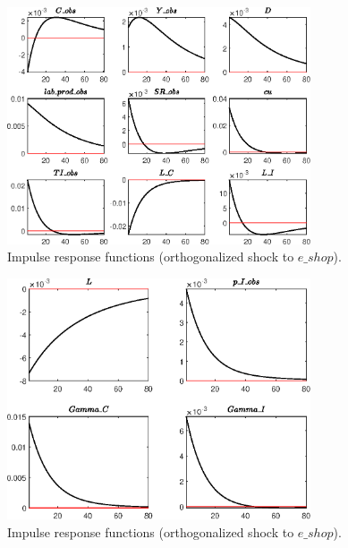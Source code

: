 \begin{figure}[H]
\centering 
\includegraphics[width=0.80\textwidth]{directed_search/graphs/directed_search_IRF_e_shop1}
\caption{Impulse response functions (orthogonalized shock to $e\_shop$).}\label{Fig:IRF:e_shop:1}
\end{figure}
 
\begin{figure}[H]
\centering 
\includegraphics[width=0.80\textwidth]{directed_search/graphs/directed_search_IRF_e_shop2}
\caption{Impulse response functions (orthogonalized shock to $e\_shop$).}\label{Fig:IRF:e_shop:2}
\end{figure}
 

